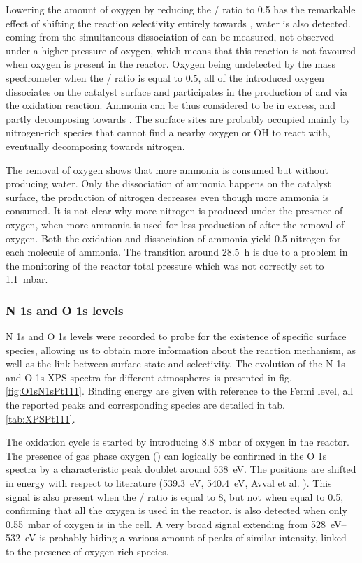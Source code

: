 Lowering the amount of oxygen by reducing the / ratio to \num{0.5} has the remarkable effect of shifting the reaction selectivity entirely towards , water is also detected.
 coming from the simultaneous dissociation of  can be measured, not observed under a higher pressure of oxygen, which means that this reaction is not favoured when oxygen is present in the reactor.
Oxygen being undetected by the mass spectrometer when the / ratio is equal to \num{0.5}, all of the introduced oxygen dissociates on the catalyst surface and participates in the production of  and  via the oxidation reaction.
Ammonia can be thus considered to be in excess, and partly decomposing towards .
The surface sites are probably occupied mainly by nitrogen-rich species that cannot find a nearby oxygen or OH to react with, eventually decomposing towards nitrogen.

The removal of oxygen shows that more ammonia is consumed but without producing water.
Only the dissociation of ammonia happens on the catalyst surface, the production of nitrogen decreases even though more ammonia is consumed.
It is not clear why more nitrogen is produced under the presence of oxygen, when more ammonia is used for less production of  after the removal of oxygen.
Both the oxidation and dissociation of ammonia yield 0.5 nitrogen for each molecule of ammonia.
The transition around \qty{28.5}{\hour} is due to a problem in the monitoring of the reactor total pressure which was not correctly set to \qty{1.1}{\milli\bar}.

\subsubsection{N 1s and O 1s levels}

N 1s and O 1s levels were recorded to probe for the existence of specific surface species, allowing us to obtain more information about the reaction mechanism, as well as the link between surface state and selectivity.
The evolution of the N 1s and O 1s XPS spectra for different atmospheres is presented in fig. \ref{fig:O1sN1sPt111}.
Binding energy are given with reference to the Fermi level, all the reported peaks and corresponding species are detailed in tab. \ref{tab:XPSPt111}.

The oxidation cycle is started by introducing \qty{8.8}{\milli\bar} of oxygen in the reactor.
The presence of gas phase oxygen () can logically be confirmed in the O 1s spectra by a characteristic peak doublet around \qty{538}{\eV}.
The positions are shifted in energy with respect to literature (\qty{539.3}{\eV}, \qty{540.4}{\eV}, Avval et al. \cite{Avval2022}).
This signal is also present when the / ratio is equal to 8, but not when equal to 0.5, confirming that all the oxygen is used in the reactor.
 is also detected when only \qty{0.55}{\milli\bar} of oxygen is in the cell.
A very broad signal extending from \qtyrange{528}{532}{\eV} is probably hiding a various amount of peaks of similar intensity, linked to the presence of oxygen-rich species.

